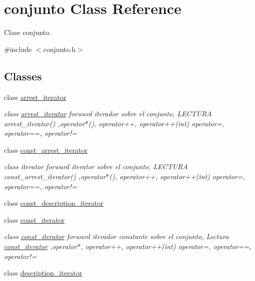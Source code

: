 \hypertarget{classconjunto}{}\section{conjunto Class Reference}
\label{classconjunto}


Clase conjunto.  




{\ttfamily \#include $<$conjunto.\+h$>$}

\subsection*{Classes}
\begin{DoxyCompactItemize}
\item 
class \hyperlink{classconjunto_1_1arrest__iterator}{arrest\+\_\+iterator}
\begin{DoxyCompactList}\small\item\em class \hyperlink{classconjunto_1_1arrest__iterator}{arrest\+\_\+iterator} forward iterador sobre el conjunto, L\+E\+C\+T\+U\+R\+A arrest\+\_\+iterator() ,operator$\ast$(), operator++, operator++(int) operator=, operator==, operator!= \end{DoxyCompactList}\item 
class \hyperlink{classconjunto_1_1const__arrest__iterator}{const\+\_\+arrest\+\_\+iterator}
\begin{DoxyCompactList}\small\item\em class iterator forward iterator sobre el conjunto, L\+E\+C\+T\+U\+R\+A const\+\_\+arrest\+\_\+iterator() ,operator$\ast$(), operator++, operator++(int) operator=, operator==, operator!= \end{DoxyCompactList}\item 
class \hyperlink{classconjunto_1_1const__description__iterator}{const\+\_\+description\+\_\+iterator}
\item 
class \hyperlink{classconjunto_1_1const__iterator}{const\+\_\+iterator}
\begin{DoxyCompactList}\small\item\em class \hyperlink{classconjunto_1_1const__iterator}{const\+\_\+iterator} forward iterador constante sobre el conjunto, Lectura \hyperlink{classconjunto_1_1const__iterator}{const\+\_\+iterator} ,operator$\ast$, operator++, operator++(int) operator=, operator==, operator!= \end{DoxyCompactList}\item 
class \hyperlink{classconjunto_1_1description__iterator}{description\+\_\+iterator}

\end{DoxyCompactItemize}
